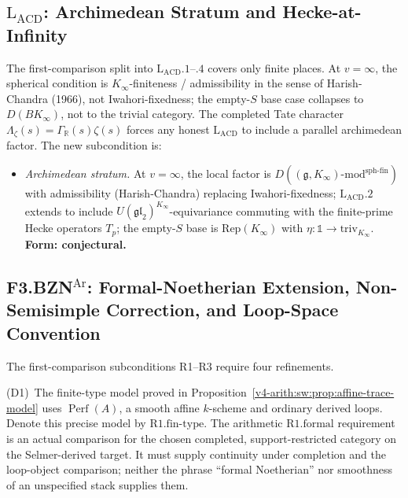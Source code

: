 \subsection{\texorpdfstring{\(\mathrm{L}_{\mathrm{ACD}}\)}{L-ACD}: Archimedean Stratum and Hecke-at-Infinity}

The first-comparison split into \(\mathrm{L}_{\mathrm{ACD}}.1\)--\(.4\)
covers only finite places. At \(v=\infty\), the spherical condition
is \(K_{\infty}\)-finiteness / admissibility in the sense of
Harish-Chandra (1966), not Iwahori-fixedness; the empty-\(S\) base
case collapses to \(D(BK_{\infty})\), not to the trivial category.
The completed Tate character
\(\Lambda_{\zeta}(s)=\Gamma_{\mathbb{R}}(s)\zeta(s)\) forces
any honest \(\mathrm{L}_{\mathrm{ACD}}\) to include a parallel
archimedean factor. The new subcondition is:
\begin{itemize}
\item[(\(\mathrm{L}_{\mathrm{ACD}}.0\))] \emph{Archimedean stratum.}
At \(v=\infty\), the local factor is
\(D((\mathfrak{g},K_{\infty})\text{-mod}^{\mathrm{sph\text{-}fin}})\)
with admissibility (Harish-Chandra) replacing Iwahori-fixedness;
\(\mathrm{L}_{\mathrm{ACD}}.2\) extends to include
\(U(\mathfrak{gl}_{2})^{K_{\infty}}\)-equivariance commuting with
the finite-prime Hecke operators \(T_{p}\); the empty-\(S\) base is
\(\mathrm{Rep}(K_{\infty})\) with
\(\eta:\mathbb{1}\to\mathrm{triv}_{K_{\infty}}\).
\textbf{Form: conjectural.}
\end{itemize}

\subsection{\texorpdfstring{F3.BZN\(^{\mathrm{Ar}}\)}{F3-BZN-Ar}: Formal-Noetherian Extension, Non-Semisimple Correction, and Loop-Space Convention}

The first-comparison subconditions R1--R3 require four refinements.

(D1)~The finite-type model proved in
Proposition~\ref{v4-arith:sw:prop:affine-trace-model} uses
\(\operatorname{Perf}(A)\), a smooth affine \(k\)-scheme and
ordinary derived loops. Denote this precise model by
\(\mathrm{R1.fin\text{-}type}\). The arithmetic
\(\mathrm{R1.formal}\) requirement is an actual comparison for
the chosen completed, support-restricted category on the
Selmer-derived target. It must supply continuity under completion
and the loop-object comparison; neither the phrase ``formal
Noetherian'' nor smoothness of an unspecified stack supplies them.

